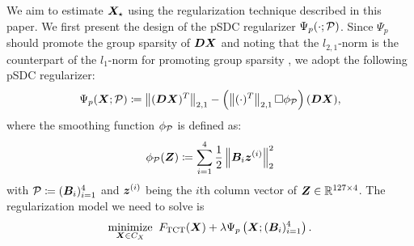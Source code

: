 \documentclass[lettersize,journal]{IEEEtran}
\theoremstyle{plain}%
\theoremstyle{definition}
\theoremstyle{remark}
\begin{document}
We aim to estimate $\bm{X}_{\star}$ using the regularization technique described in this paper. We first present the design of the pSDC regularizer $\Psi_{p}(\cdot;\mathcal{P})$. Since $\Psi_p$ should promote the group sparsity of $\bm{D}\bm{X}$ and noting that the $l_{2,1}$-norm is the counterpart of the $l_1$-norm for promoting group sparsity \cite{eldar2010}, we adopt the following pSDC regularizer:
\begin{equation*}\label{eq:Psi_for_Poisson}
\Psi_{p}(\bm{X};\mathcal{P})\coloneqq \left\| (\bm{D}\bm{X})^T \right\|_{2,1}-\left( \left\| (\cdot)^T \right\|_{2,1}\Box \phi_{\mathcal{P}} \right )(\bm{D}\bm{X}),
\end{equation*}
where the smoothing function $\phi_{\mathcal{P}}$ is defined as:
\begin{equation*}
\phi_{\mathcal{P}}(\bm{Z})\coloneqq \sum_{i=1}^4 \frac{1}{2}\left\| \bm{B}_i\bm{z}^{(i)} \right\|^2_2
\end{equation*}
with $\mathcal{P}\coloneqq (\bm{B}_i)_{i=1}^4$ and $\bm{z}^{(i)}$ being the $i$th column vector of $\bm{Z}\in\mathbb{R}^{127\times 4}$. The regularization model we need to solve is 
\begin{equation}\label{eq:poisson_denoising}
\underset{\bm{X}\in C_X}{\mathrm{minimize}}\;\; F_{\mathrm{TCT}}(\bm{X})+\lambda\Psi_{p}\left( \bm{X};(\bm{B}_i)_{i=1}^4 \right ).
\end{equation}
\end{document}
